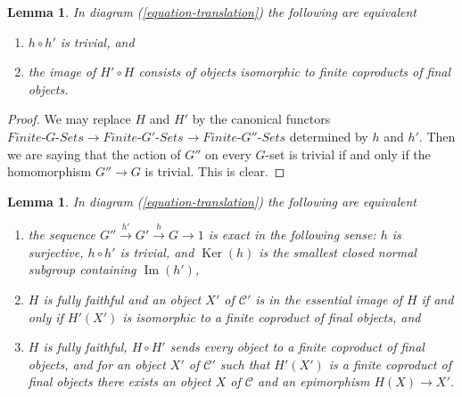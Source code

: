 \documentclass{stacks-project}
\theoremstyle{plain}
\newtheorem{lemma}[subsection]{Lemma}
\theoremstyle{definition}
\theoremstyle{remark}
\numberwithin{equation}{subsection}
\def\Ker{\mathop{\mathrm{Ker}}}
\def\Im{\mathop{\mathrm{Im}}}
\begin{document}
\begin{lemma}
\label{lemma-composition-trivial}
In diagram (\ref{equation-translation}) the following are equivalent
\begin{enumerate}
\item $h \circ h'$ is trivial, and
\item the image of $H' \circ H$ consists of objects isomorphic to finite
coproducts of final objects.
\end{enumerate}
\end{lemma}

\begin{proof}
We may replace $H$ and $H'$ by the canonical functors
$\textit{Finite-}G\textit{-Sets} \to \textit{Finite-}G'\textit{-Sets}
\to \textit{Finite-}G''\textit{-Sets}$ determined by $h$ and $h'$.
Then we are saying that the action of $G''$ on every $G$-set is trivial
if and only if the homomorphism $G'' \to G$ is trivial. This is clear.
\end{proof}

\begin{lemma}
\label{lemma-functoriality-galois-ses}
In diagram (\ref{equation-translation}) the following are equivalent
\begin{enumerate}
\item the sequence $G'' \xrightarrow{h'} G' \xrightarrow{h} G \to 1$
is exact in the following sense: $h$ is surjective, $h \circ h'$ is trivial,
and $\Ker(h)$ is the smallest closed normal subgroup containing $\Im(h')$,
\item $H$ is fully faithful and an object $X'$ of $\mathcal{C}'$ is in
the essential image of $H$ if and only if $H'(X')$ is isomorphic to a
finite coproduct of final objects, and
\item $H$ is fully faithful, $H \circ H'$ sends every object to a finite
coproduct of final objects, and for an object $X'$ of $\mathcal{C}'$
such that $H'(X')$ is a finite coproduct of final objects there exists
an object $X$ of $\mathcal{C}$ and an epimorphism $H(X) \to X'$.
\end{enumerate}
\end{lemma}
\end{document}

